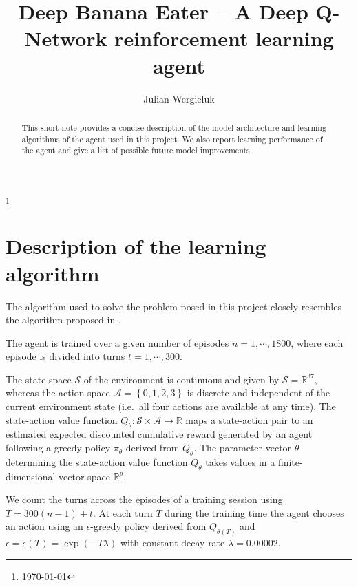 \documentclass[a4paper,11pt]{amsart}
\title{Deep Banana Eater -- A Deep Q-Network reinforcement learning agent}
\author{Julian Wergieluk}\address{}\email{julian.wergieluk@risklab.com}
\begin{document}
\maketitle

\begin{abstract}
This short note provides a concise description of the model architecture and
learning algorithms of the agent used in this project. We also report learning
performance of the agent and give a list of possible future model improvements.
\end{abstract}
\renewcommand*{\thefootnote}{}\footnote{\today{}}

\section{Description of the learning algorithm}


The algorithm used to solve the problem posed in this project closely resembles
the algorithm proposed in \cite{mnih2015humanlevel}.

The agent is trained over a given number of episodes $n = 1,\cdots, 1800$,
where each episode is divided into turns $t = 1,\cdots, 300$.

The state space $\mathcal S$ of the environment is continuous and given by
$\mathcal S = \mathbb R^{37}$, whereas the action space $\mathcal A = \left\{
0,1,2,3 \right\}$ is discrete and independent of the current environment state
(i.e.\ all four actions are available at any time). The state-action value
function $Q_{\theta}: \mathcal S \times \mathcal A \mapsto \mathbb R$ maps a
state-action pair to an estimated expected discounted cumulative reward
generated by an agent following a greedy policy $\pi_{\theta}$ derived from $Q_{\theta}$.
The parameter vector $\theta$ determining the state-action value function
$Q_{\theta}$ takes values in a finite-dimensional vector space $\mathbb R^{p}$. 

We count the turns across the episodes of a training session using $T =
300(n-1) + t$. At each turn $T$ during the training time the agent chooses an
action using an $\epsilon$-greedy policy derived from $Q_{\theta(T)}$ and
$\epsilon = \epsilon(T) = \operatorname{exp}\left( -T \lambda \right)$ with
constant decay rate $\lambda = 0.00002$.
\end{document}
